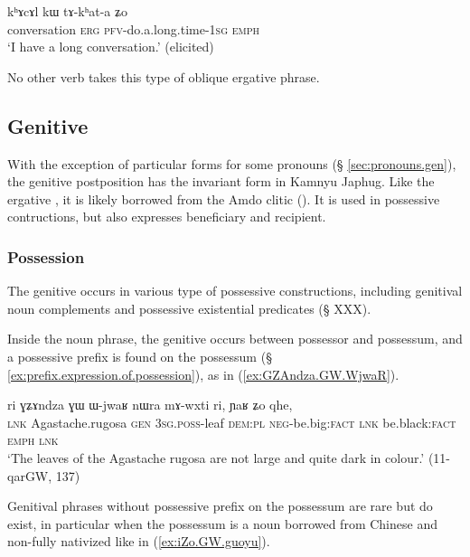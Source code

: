   \begin{exe}
\ex \label{ex:khAcAl.kW.takhata}
\gll kʰɤcɤl kɯ tɤ-kʰat-a ʑo \\
conversation \textsc{erg} \textsc{pfv}-do.a.long.time-\textsc{1sg} \textsc{emph} \\
\glt `I have a long conversation.' (elicited)
\end{exe}

No other verb takes this type of oblique ergative phrase.

\subsection{Genitive} \label{sec:genitive}
With the exception of particular forms for some pronouns (§ \ref{sec:pronouns.gen}), the genitive postposition has the invariant form  in Kamnyu Japhug. Like the ergative , it is likely borrowed from the Amdo clitic  (\citealt[62]{haller04themchen}). It is used in possessive contructions, but also expresses beneficiary and recipient.

\subsubsection{Possession} \label{sec:gen.possession}
The genitive  occurs in various type of possessive constructions, including genitival noun complements and possessive existential predicates (§ XXX).

Inside the noun phrase, the genitive occurs between possessor and possessum, and a possessive prefix is found on the possessum (§ \ref{ex:prefix.expression.of.possession}), as in (\ref{ex:GZAndza.GW.WjwaR}).  

\begin{exe}
\ex \label{ex:GZAndza.GW.WjwaR}
\gll ri ɣʑɤndza ɣɯ ɯ-jwaʁ nɯra mɤ-wxti ri, ɲaʁ ʑo qhe, \\
\textsc{lnk} Agastache.rugosa \textsc{gen} \textsc{3sg}.\textsc{poss}-leaf \textsc{dem}:\textsc{pl} \textsc{neg}-be.big:\textsc{fact} \textsc{lnk} be.black:\textsc{fact} \textsc{emph} \textsc{lnk} \\
\glt `The leaves of the Agastache rugosa are not large and quite dark in colour.' (11-qarGW, 137)
\end{exe}

Genitival phrases without possessive prefix on the possessum are rare but do exist, in particular when the possessum is a noun borrowed from Chinese and non-fully nativized like  in (\ref{ex:iZo.GW.guoyu}).  

